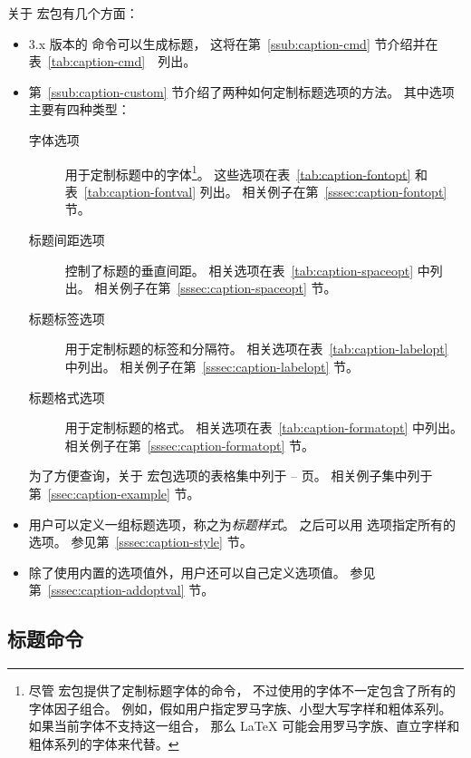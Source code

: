 关于  宏包有几个方面：
\begin{itemize}
	\item 3.x 版本的  命令可以生成标题，
	这将在第~\ref{ssub:caption-cmd} 节介绍并在表~\ref{tab:caption-cmd}　列出。
	
	\item 第~\ref{ssub:caption-custom} 节介绍了两种如何定制标题选项的方法。
	其中选项主要有四种类型：
	\begin{description}
		\item[字体选项] 用于定制标题中的字体\footnote{%
			尽管  宏包提供了定制标题字体的命令，
			不过使用的字体不一定包含了所有的字体因子组合。
			例如，假如用户指定罗马字族、小型大写字样和粗体系列。
			如果当前字体不支持这一组合，
			那么 \LaTeX{} 可能会用罗马字族、直立字样和粗体系列的字体来代替。}。
		这些选项在表~\ref{tab:caption-fontopt} 和表~\ref{tab:caption-fontval} 列出。
		相关例子在第~\ref{sssec:caption-fontopt} 节。
		
		\item[标题间距选项] 控制了标题的垂直间距。
		相关选项在表~\ref{tab:caption-spaceopt} 中列出。
		相关例子在第~\ref{sssec:caption-spaceopt} 节。
		
		\item[标题标签选项] 用于定制标题的标签和分隔符。
		相关选项在表~\ref{tab:caption-labelopt} 中列出。
		相关例子在第~\ref{sssec:caption-labelopt} 节。
		
		\item[标题格式选项] 用于定制标题的格式。
		相关选项在表~\ref{tab:caption-formatopt} 中列出。
		相关例子在第~\ref{sssec:caption-formatopt} 节。
	\end{description}
	为了方便查询，关于  宏包选项的表格集中列于 \pageref{tab:caption-fontopt}--\pageref{tab:caption-formatopt} 页。
	相关例子集中列于第~\ref{ssec:caption-example} 节。
	
	\item 用户可以定义一组标题选项，称之为\emph{标题样式}。
	之后可以用  选项指定所有的选项。
	参见第~\ref{sssec:caption-style} 节。
	
	\item 除了使用内置的选项值外，用户还可以自己定义选项值。
	参见第~\ref{sssec:caption-addoptval} 节。
\end{itemize}

\subsection{标题命令} \label{ssec:caption-cmd}


